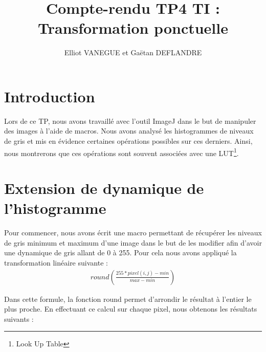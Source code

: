 \documentclass[a4paper,11pt]{article}
\title{Compte-rendu TP4 TI : Transformation ponctuelle}
\author{Elliot VANEGUE et Gaëtan DEFLANDRE}
\begin{document}


  \maketitle
  
  \mbox{}
  \newpage
  \clearpage
  
  \section*{Introduction}
  Lors de ce TP, nous avons travaillé avec l'outil ImageJ dans le but de manipuler des images
  à l'aide de macros. Nous avons analysé les histogrammes de niveaux de gris et mis en 
  évidence certaines opérations possibles sur ces derniers. Ainsi, nous montrerons que ces
  opérations sont souvent associées avec une LUT\footnote{Look Up Table}.

  \section{Extension de dynamique de l'histogramme}
  Pour commencer, nous avons écrit une macro permettant de récupérer les niveaux de gris minimum et 
  maximum d'une image dans le but de les modifier afin d'avoir une dynamique de gris allant de 
  0 à 255. Pour cela nous avons appliqué la transformation linéaire suivante : 
  \begin{align*}
   round\left(\frac{255 * pixel(i,j) - min}{max - min}\right)
  \end{align*}

  Dans cette formule, la fonction round permet d'arrondir le résultat à l'entier le plus proche.
  En effectuant ce calcul sur chaque pixel, nous obtenons les résultats suivants :\\
  
\end{document}
